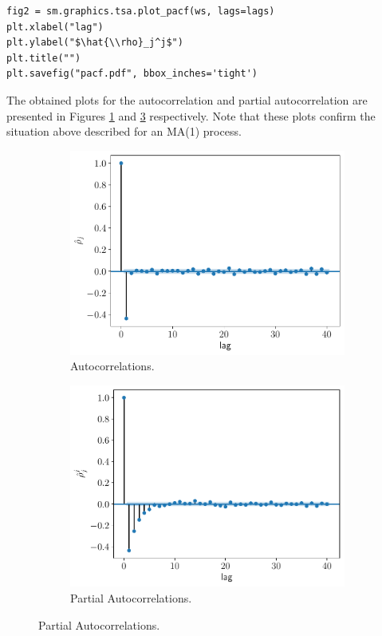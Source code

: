 \documentclass[fleqn]{article}
\begin{document}
\begin{enumerate}
\begin{verbatim}
fig2 = sm.graphics.tsa.plot_pacf(ws, lags=lags)
plt.xlabel("lag")
plt.ylabel("$\hat{\\rho}_j^j$")
plt.title("")
plt.savefig("pacf.pdf", bbox_inches='tight')
\end{verbatim}

The obtained plots for the autocorrelation and partial autocorrelation are presented in Figures \ref{fig:acf} and \ref{fig:pacf} respectively. Note that these plots confirm the situation above described for an MA(1) process.

\begin{figure}[H]
    \centering
    \begin{subfigure}[b]{0.45\textwidth}
        \centering
        \includegraphics[width=\textwidth]{figs/acf.pdf}
        \caption{Autocorrelations.}
        \label{fig:acf}
    \end{subfigure}
    \begin{subfigure}[b]{0.45\textwidth}  
        \centering 
        \includegraphics[width=\textwidth]{figs/pacf.pdf}
        \caption{Partial Autocorrelations.}
        \label{fig:pacf}
    \end{subfigure}
\end{figure}

\end{enumerate}
% 
% 
\end{document}
